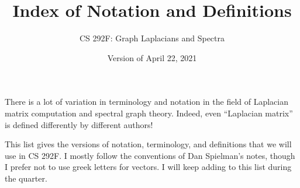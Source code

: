 \documentclass[11pt]{article}
\begin{document}
\title{Index of Notation and Definitions}
\author{CS 292F: Graph Laplacians and Spectra}
\date{Version of April 22, 2021}
\maketitle

There is a lot of variation in terminology and notation in
the field of Laplacian matrix computation and spectral graph 
theory.  
Indeed, even ``Laplacian matrix'' is defined differently by
different authors!

This list gives the versions of notation, terminology, and definitions 
that we will use in CS 292F.
I mostly follow the conventions of Dan Spielman's notes, 
though I prefer not to use greek letters for vectors.
I will keep adding to this list during the quarter.
\end{document}
